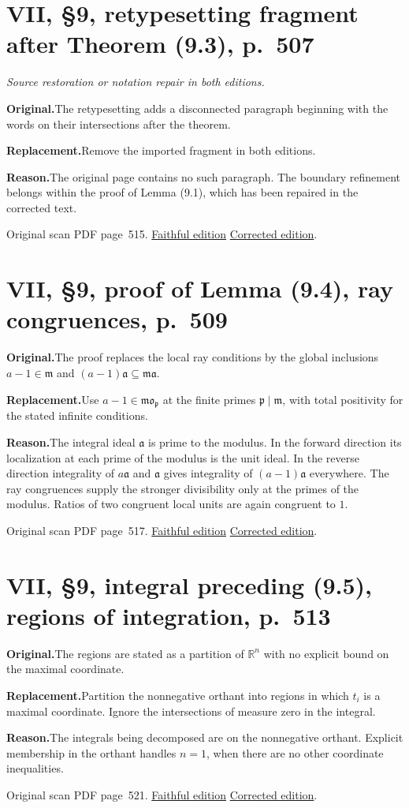 \documentclass[11pt,a4paper]{article}
\newcommand{\original}{\par\smallskip\noindent\textbf{Original.}\enspace}
\newcommand{\replacement}{\par\smallskip\noindent\textbf{Replacement.}\enspace}
\newcommand{\reason}{\par\smallskip\noindent\textbf{Reason.}\enspace}
\newcommand{\editionlink}[3]{\href{#1\#errata.#2}{#3}}
\newcommand{\location}[2]{%
  \par\smallskip\noindent Original scan PDF page~#2.\enspace
  \editionlink{Neukirch_Faithful.pdf}{#1}{Faithful edition}
  \quad\editionlink{Neukirch_Corrected.pdf}{#1}{Corrected edition}.}
\begin{document}
\setcounter{section}{154}
\section{VII, \S9, retypesetting fragment after Theorem (9.3), p.~507}\label{errata:item:155}
\noindent\emph{Source restoration or notation repair in both editions.}\par
\original The retypesetting adds a disconnected paragraph beginning with the words on their intersections after the theorem.
\replacement Remove the imported fragment in both editions.
\reason The original page contains no such paragraph. The boundary refinement belongs within the proof of Lemma (9.1), which has been repaired in the corrected text.
\location{155}{515}

\setcounter{section}{155}
\section{VII, \S9, proof of Lemma (9.4), ray congruences, p.~509}\label{errata:item:156}

\original The proof replaces the local ray conditions by the global inclusions $a-1\in\mathfrak m$ and $(a-1)\mathfrak a\subseteq\mathfrak m\mathfrak a$.
\replacement Use $a-1\in\mathfrak m\mathfrak o_{\mathfrak p}$ at the finite primes $\mathfrak p\mid\mathfrak m$, with total positivity for the stated infinite conditions.
\reason The integral ideal $\mathfrak a$ is prime to the modulus. In the forward direction its localization at each prime of the modulus is the unit ideal. In the reverse direction integrality of $a\mathfrak a$ and $\mathfrak a$ gives integrality of $(a-1)\mathfrak a$ everywhere. The ray congruences supply the stronger divisibility only at the primes of the modulus. Ratios of two congruent local units are again congruent to $1$.
\location{156}{517}

\setcounter{section}{156}
\section{VII, \S9, integral preceding (9.5), regions of integration, p.~513}\label{errata:item:157}

\original The regions are stated as a partition of $\mathbb R^n$ with no explicit bound on the maximal coordinate.
\replacement Partition the nonnegative orthant into regions in which $t_i$ is a maximal coordinate. Ignore the intersections of measure zero in the integral.
\reason The integrals being decomposed are on the nonnegative orthant. Explicit membership in the orthant handles $n=1$, when there are no other coordinate inequalities.
\location{157}{521}
\end{document}
